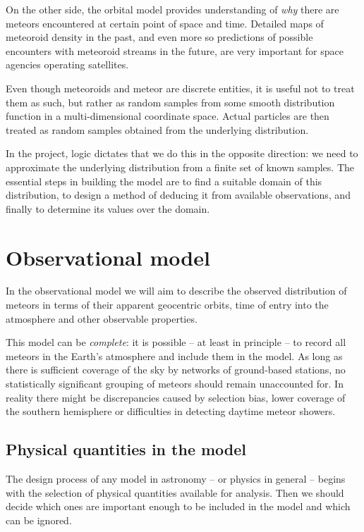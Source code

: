 On the other side, the orbital model provides understanding of \emph{why} there are meteors
encountered at certain point of space and time. Detailed maps of meteoroid density in the past,
and even more so predictions of possible encounters with meteoroid streams in the future,
are very important for space agencies operating satellites.

Even though meteoroids and meteor are discrete entities, it is useful not to treat them as such,
but rather as random samples from some smooth distribution function in a multi-dimensional coordinate space.
Actual particles are then treated as random samples obtained from the underlying distribution.

In the project, logic dictates that we do this in the opposite direction: we need to approximate
the underlying distribution from a finite set of known samples.
The essential steps in building the model are to find a suitable domain of this distribution,
to design a method of deducing it from available observations, and finally to
determine its values over the domain.


\section{Observational model} \label{ms}
    In the observational model we will aim to describe the observed distribution of meteors
    in terms of their apparent geocentric orbits, time of entry into the atmosphere and other
    observable properties.

    This model can be \emph{complete}: it is possible -- at least in principle -- to record all
    meteors in the Earth's atmosphere and include them in the model.
    As long as there is sufficient coverage of the sky by networks of ground-based stations,
    no statistically significant grouping of meteors should remain unaccounted for.
    In reality there might be discrepancies caused by selection bias,
    lower coverage of the southern hemisphere or difficulties in detecting daytime meteor showers.

    \subsection{Physical quantities in the model} \label{msp}
        The design process of any model in astronomy -- or physics in general -- begins with the selection
        of physical quantities available for analysis. Then we should decide which ones are important enough
        to be included in the model and which can be ignored.

